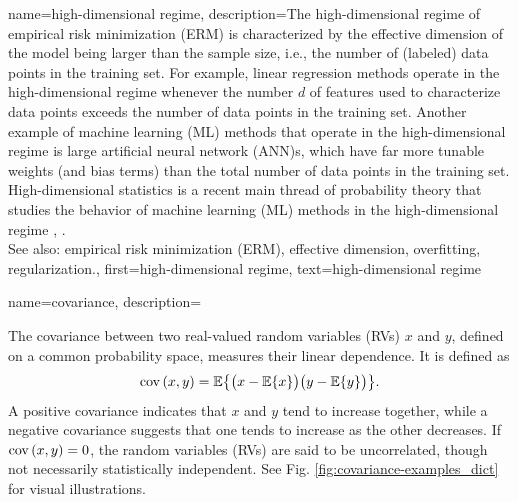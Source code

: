 {
{name={high-dimensional regime}, 
	description={The 
		high-dimensional regime of empirical risk minimization (ERM) is characterized by the effective dimension of the model 
		being larger than the sample size, i.e., the number of (labeled) data points in the training set. 
		For example, linear regression methods operate in the high-dimensional regime whenever the number $d$ of features 
		used to characterize data points exceeds the number of data points in the training set. 
		Another example of machine learning (ML) methods that operate in the high-dimensional regime is large artificial neural network (ANN)s, which have 
		far more tunable weights (and bias terms) than the total number of data points in the training set. 
		High-dimensional statistics is a recent main thread of probability theory that studies the 
		behavior of machine learning (ML) methods in the high-dimensional regime \cite{Wain2019}, \cite{BuhlGeerBook}.
				\\
		See also: empirical risk minimization (ERM), effective dimension, overfitting, regularization.},
   	first={high-dimensional regime},
	text={high-dimensional regime} 
}

{name={covariance}, 
	description={The covariance between two real-valued 
 		random variables (RVs) $x$ and $y$, defined on a common probability space, measures their linear 
 		dependence. It is defined as 
			$$
			{\rm cov}\left(x,y\right) = \mathbb{E} \big\{ \big(x - \mathbb{E} \{ x\} \big)\big(y - \mathbb{E} \{y\} \big)\big\}.
			$$
		A positive covariance indicates that $x$ and $y$ tend to increase together, 
		while a negative covariance suggests that one tends to increase as the other decreases. 
		If ${\rm cov}\left(x,y\right) = 0$, the random variables (RVs) are said to be uncorrelated, though not necessarily statistically 
		independent. See Fig. \ref{fig:covariance-examples_dict} for visual illustrations.
		\begin{figure}[H]
\end{figure}}}}
